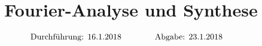 

\subject{V351}
\title{Fourier-Analyse und Synthese}

\date{
  \begin{align}
    \text{Durchführung: } & \text{16.1.2018} & \hspace{3em} & \text{Abgabe: 23.1.2018} \notag
  \end{align}
}




\maketitle
\thispagestyle{empty}
\tableofcontents
\newpage






\nocite{*}
\printbibliography{}


